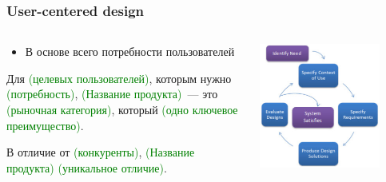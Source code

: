 \documentclass{../../slides-style}
\begin{document}
    \begin{frame}
        \frametitle{User-centered design}
        \begin{columns}
            \begin{column}{0.5\textwidth}
                \begin{itemize}
                    \item В основе всего потребности пользователей
                \end{itemize}
                Для \textcolor{green}{(целевых пользователей)}, которым нужно \textcolor{green}{(потребность)}, \textcolor{green}{(Название продукта)}~--- это \textcolor{green}{(рыночная категория)}, который \textcolor{green}{(одно ключевое преимущество)}.

                \vspace{5mm}

                В отличие от \textcolor{green}{(конкуренты)}, \textcolor{green}{(Название продукта)} \textcolor{green}{(уникальное отличие)}.
            \end{column}
            \begin{column}{0.5\textwidth}
                \begin{center}
                    \includegraphics[width=0.8\textwidth]{userCenteredDesignLoop.png}
                \end{center}
            \end{column}
        \end{columns}
    \end{frame}
\end{document}
